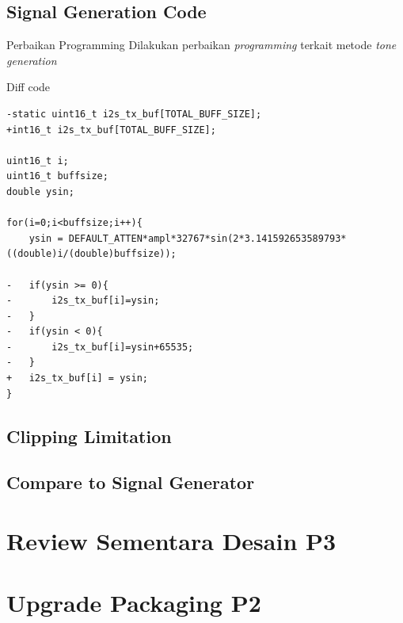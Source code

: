\documentclass[table,dvipsnames]{beamer}
\begin{document}
	\begin{frame}[fragile]
		\subsection{Signal Generation Code}
		\begin{exampleblock}{Perbaikan Programming}
			Dilakukan perbaikan \textit{programming} terkait metode \textit{tone generation}
		\end{exampleblock}
	
		\begin{exampleblock}{Diff code}
			\begin{verbatim}
-static uint16_t i2s_tx_buf[TOTAL_BUFF_SIZE];
+int16_t i2s_tx_buf[TOTAL_BUFF_SIZE];

uint16_t i;
uint16_t buffsize;
double ysin;

for(i=0;i<buffsize;i++){
	ysin = DEFAULT_ATTEN*ampl*32767*sin(2*3.141592653589793*((double)i/(double)buffsize));
	
-	if(ysin >= 0){
-		i2s_tx_buf[i]=ysin;
-	}
-	if(ysin < 0){
-		i2s_tx_buf[i]=ysin+65535;
-	}
+ 	i2s_tx_buf[i] = ysin;
}
			\end{verbatim}
		\end{exampleblock}
	\end{frame}
	
	\subsection{Clipping Limitation}
	
	\subsection{Compare to Signal Generator}
	
	\section {Review Sementara Desain P3}
	
	\section{Upgrade Packaging P2}
\end{document}
